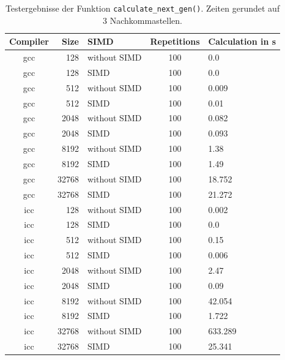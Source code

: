 \documentclass[german,plainarticle,hyperref,utf8]{zihpub}
\begin{document}
	\begin{table}
		\begin{center}
			\begin{tabular}{||c r l c l||}
				\hline
				Compiler & Size  & SIMD & Repetitions & Calculation in s \\ [1ex]
				\hline\hline
				gcc & 128   & without SIMD & 100 & 0.0       \\ \hline
				gcc & 128   & SIMD         & 100 & 0.0       \\ \hline
				gcc & 512   & without SIMD & 100 & 0.009     \\ \hline
				gcc & 512   & SIMD         & 100 & 0.01      \\ \hline
				gcc & 2048  & without SIMD & 100 & 0.082    \\ \hline
				gcc & 2048  & SIMD         & 100 & 0.093     \\ \hline
				gcc & 8192  & without SIMD & 100 & 1.38    \\ \hline
				gcc & 8192  & SIMD         & 100 & 1.49    \\ \hline
				gcc & 32768 & without SIMD & 100 & 18.752    \\ \hline
				gcc & 32768 & SIMD         & 100 & 21.272    \\ \hline \hline
				icc & 128   & without SIMD & 100 & 0.002    \\ \hline
				icc & 128   & SIMD         & 100 & 0.0       \\ \hline
				icc & 512   & without SIMD & 100 & 0.15      \\ \hline
				icc & 512   & SIMD         & 100 & 0.006     \\ \hline
				icc & 2048  & without SIMD & 100 & 2.47      \\ \hline
				icc & 2048  & SIMD         & 100 & 0.09      \\ \hline
				icc & 8192  & without SIMD & 100 & 42.054   \\ \hline
				icc & 8192  & SIMD         & 100 & 1.722    \\ \hline
				icc & 32768 & without SIMD & 100 & 633.289 \\ \hline
				icc & 32768 & SIMD         & 100 & 25.341    \\ \hline
			\end{tabular}
			\caption{\label{tab:calc}Testergebnisse der Funktion \texttt{calculate\_next\_gen()}. Zeiten gerundet auf 3 Nachkommastellen.}
		\end{center}
	\end{table}
	\clearpage
	
\end{document}
